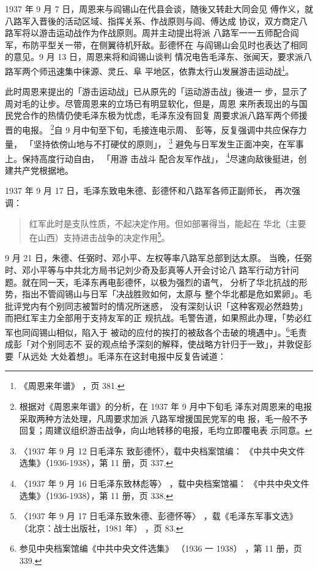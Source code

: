 1937 年 9 月 7 日，周恩来与阎锡山在代县会谈，随後又转赴大同会见
傅作义，就八路军入晋後的活动区域、指挥关系、作战原则与阎、傅达成
协议，双方商定八路军将以游击运动战作为作战原则。周并主动提出将派
八路军一一五师配合阎军，布防平型关一带，在侧翼待机歼敌。彭德怀在
与阎锡山会见时也表达了相同的意见。9 月 13 日，周恩来将和阎锡山谈判
情况电告毛泽东、张闻天，要求派八路军两个师迅速集中徕源、灵丘、阜
平地区，依靠太行山发展游击运动战\footnote{《周恩来年谱》
，页 381.}。
 
此时周恩来提出的「游击运动战」已从原先的「运动游击战」後进一 步，显示了
周对毛的让步。尽管周恩来的立场已有明显软化，但是，周恩 来所表现出的与国
民党合作的热情仍使毛泽东极为忧虑，毛泽东没有回复 周要求派八路军两个师援
晋的电报。 \footnote{根据对《周恩来年谱》的分析，在 1937 年 9 月中下旬毛
泽东对周恩来的电报采取两种方法处理，凡周要求加派 八路军增援国民党军的电
报，毛一般不予回复；周建议组织游击战争，向山地转移的电报，毛均立即覆电表
示同意。}自 9 月中旬至下旬，毛接连电示周、 彭等，反复强调中共应保存力量，
「坚持依傍山地与不打硬仗的原则」， \footnote{〈1937 年 9 月 12 日毛泽东
致彭德怀〉，载中央档案馆编： 《中共中央文件选集》（1936-1938），第 11
册，页 337.} 避免与日军发生正面冲突，在军事上。保持高度行动自由， 「用游
击战斗 配合友军作战」， \footnote{〈1937 年 9 月 16 日毛泽东致林彪等〉
，载中央档案馆褊： 《中共中央文件选集》（1936-1938），第 11 册，页
338.}尽速向敌後挺进，创建共产党根据地。
 
1937 年 9 月 17 日，毛泽东致电朱德、彭德怀和八路军各师正副师长，
再次强调：
\begin{quote}
	\fzwkai 红军此时是支队性质，不起决定作用。但如部署得当，能起在
	华北（主要在山西）支持进击战争的决定作用\footnote{〈1937 年 9 月 17 日毛泽东致朱德、彭德怀等〉
，载《毛泽东军事文选》
（北京：战士出版社，1981 年）
，页 83.}。
\end{quote}

 
9 月 21 日，朱德、任弼时、邓小平、左权等率八路军总部到达太原。
当晚，任弼时、邓小平等与中共北方局书记刘少奇及彭真等人开会讨论八
路军行动方针问题。就在同一天，毛泽东再电彭德怀，以极为强烈的语气，
分析了华北抗战的形势，指出不管阎锡山与日军「决战胜败如何，太原与
整个华北都是危如累卵」。毛批评党内有个别同志被暂时的情况所迷惑，
没有深刻认识「这种客观必然趋势」而把红军主力全部用于支持友军的正
规抗战。毛警告道，如果照此办理，「势必红军也同阎锡山相似，陷入于
被动的应付的挨打的被敌各个击破的境遇中」。\footnote{参见中央档案馆编《中共中央文件选集》
（1936 一 1938）
，第 11 册，页 339.}毛责成彭「对个别同志不
妥的观点给予深刻的解释，使战略方针归于一致」，并敦促彭要「从远处
大处着想」。毛泽东在这封电报中反复告诫道：

